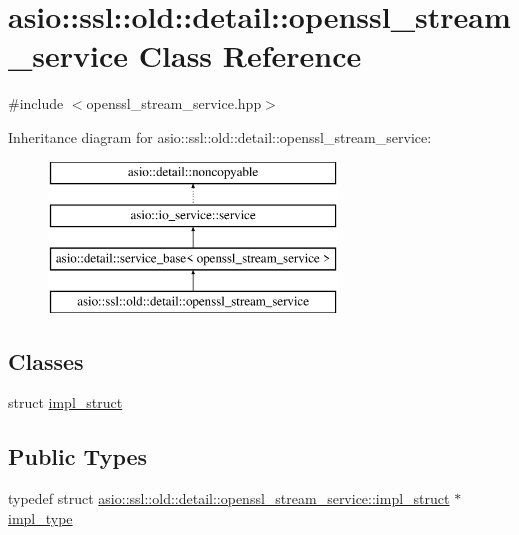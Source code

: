 \hypertarget{classasio_1_1ssl_1_1old_1_1detail_1_1openssl__stream__service}{}\section{asio\+:\+:ssl\+:\+:old\+:\+:detail\+:\+:openssl\+\_\+stream\+\_\+service Class Reference}
\label{classasio_1_1ssl_1_1old_1_1detail_1_1openssl__stream__service}


{\ttfamily \#include $<$openssl\+\_\+stream\+\_\+service.\+hpp$>$}

Inheritance diagram for asio\+:\+:ssl\+:\+:old\+:\+:detail\+:\+:openssl\+\_\+stream\+\_\+service\+:\begin{figure}[H]
\begin{center}
\leavevmode
\includegraphics[height=4.000000cm]{classasio_1_1ssl_1_1old_1_1detail_1_1openssl__stream__service}
\end{center}
\end{figure}
\subsection*{Classes}
\begin{DoxyCompactItemize}
\item 
struct \hyperlink{structasio_1_1ssl_1_1old_1_1detail_1_1openssl__stream__service_1_1impl__struct}{impl\+\_\+struct}
\end{DoxyCompactItemize}
\subsection*{Public Types}
\begin{DoxyCompactItemize}
\item 
typedef struct \hyperlink{structasio_1_1ssl_1_1old_1_1detail_1_1openssl__stream__service_1_1impl__struct}{asio\+::ssl\+::old\+::detail\+::openssl\+\_\+stream\+\_\+service\+::impl\+\_\+struct} $\ast$ \hyperlink{classasio_1_1ssl_1_1old_1_1detail_1_1openssl__stream__service_a2419fd5a889197ed63b6d0bd14656027}{impl\+\_\+type}
\end{DoxyCompactItemize}
